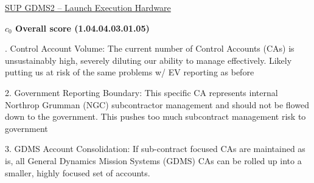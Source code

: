 % 


\begin{frame}{\href{run:../local/source-docs/1.04.04.03.01.05.pdf}{SUP GDMS2 – Launch Execution Hardware}}
\centering
{}
\par
\vspace{0.75em}
\textbf{\small{\(c_0\) Overall score {\tiny (1.04.04.03.01.05)}}}\\\par
\vspace{0.5em}
\begin{minipage}{0.85\textwidth}
\raggedright
\fontsize{7}{9}. Control Account Volume: The current number of Control Accounts (CAs) is unsustainably high, severely diluting our ability to manage effectively. Likely putting us at risk of the same problems w/ EV reporting as before\par\vspace{0.5em}2. Government Reporting Boundary: This specific CA represents internal Northrop Grumman (NGC) subcontractor management and should not be flowed down to the government. This pushes too much subcontract management risk to government\par\vspace{0.5em}3. GDMS Account Consolidation: If sub-contract focused CAs are maintained as is, all General Dynamics Mission Systems (GDMS) CAs can be rolled up into a smaller, highly focused set of accounts.\par
\end{minipage}
\end{frame}
%
